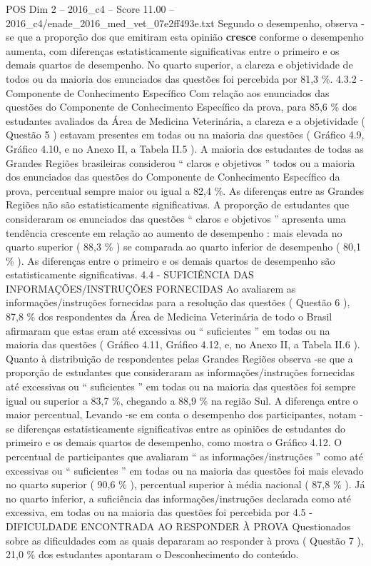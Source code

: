 \begin{textsample}{POS Dim 2 – 2016\_c4 – Score 11.00 – 2016\_c4/enade\_2016\_med\_vet\_07e2ff493e.txt}
Segundo o desempenho, observa -se que a proporção dos que emitiram esta opinião \textbf{cresce} conforme o desempenho aumenta, com diferenças estatisticamente significativas entre o primeiro e os demais quartos de desempenho.
No quarto superior, a clareza e objetividade de todos ou da maioria dos enunciados das questões foi percebida por 81,3 \%. 4.3.2 - Componente de Conhecimento Específico Com relação aos enunciados das questões do Componente de Conhecimento Específico da prova, para 85,6 \% dos estudantes avaliados da Área de Medicina Veterinária, a clareza e a objetividade ( Questão 5 ) estavam presentes em todas ou na maioria das questões ( Gráfico 4.9, Gráfico 4.10, e no Anexo II, a Tabela II.5 ).
A maioria dos estudantes de todas as Grandes Regiões brasileiras considerou “ claros e objetivos ” todos ou a maioria dos enunciados das questões do Componente de Conhecimento Específico da prova, percentual sempre maior ou igual a 82,4 \%.
As diferenças entre as Grandes Regiões não são estatisticamente significativas.
A proporção de estudantes que consideraram os enunciados das questões “ claros e objetivos ” apresenta uma tendência crescente em relação ao aumento de desempenho : mais elevada no quarto superior ( 88,3 \% ) se comparada ao quarto inferior de desempenho ( 80,1 \% ).
As diferenças entre o primeiro e os demais quartos de desempenho são estatisticamente significativas. 4.4 - SUFICIÊNCIA DAS INFORMAÇÕES/INSTRUÇÕES FORNECIDAS Ao avaliarem as informações/instruções fornecidas para a resolução das questões ( Questão 6 ), 87,8 \% dos respondentes da Área de Medicina Veterinária de todo o Brasil afirmaram que estas eram até excessivas ou “ suficientes ” em todas ou na maioria das questões ( Gráfico 4.11, Gráfico 4.12, e, no Anexo II, a Tabela II.6 ).
Quanto à distribuição de respondentes pelas Grandes Regiões observa -se que a proporção de estudantes que consideraram as informações/instruções fornecidas até excessivas ou “ suficientes ” em todas ou na maioria das questões foi sempre igual ou superior a 83,7 \%, chegando a 88,9 \% na região Sul.
A diferença entre o maior percentual, Levando -se em conta o desempenho dos participantes, notam -se diferenças estatisticamente significativas entre as opiniões de estudantes do primeiro e os demais quartos de desempenho, como mostra o Gráfico 4.12.
O percentual de participantes que avaliaram “ as informações/instruções ” como até excessivas ou “ suficientes ” em todas ou na maioria das questões foi mais elevado no quarto superior ( 90,6 \% ), percentual superior à média nacional ( 87,8 \% ).
Já no quarto inferior, a suficiência das informações/instruções declarada como até excessiva, em todas ou na maioria das questões foi percebida por 4.5 - DIFICULDADE ENCONTRADA AO RESPONDER À PROVA Questionados sobre as dificuldades com as quais depararam ao responder à prova ( Questão 7 ), 21,0 \% dos estudantes apontaram o Desconhecimento do conteúdo.

\end{textsample}
